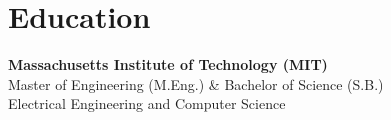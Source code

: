 \section{Education}

\textbf{Massachusetts Institute of Technology (MIT)}\\
Master of Engineering (M.Eng.) \& Bachelor of Science (S.B.) \\
Electrical Engineering and Computer Science


